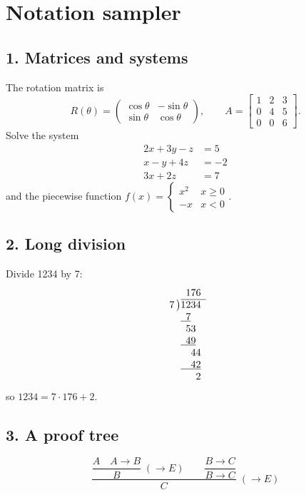 \documentclass[11pt]{article}
\begin{document}
\section*{Notation sampler}

\subsection*{1. Matrices and systems}
The rotation matrix is
\[ R(\theta) = \begin{pmatrix} \cos\theta & -\sin\theta \\ \sin\theta & \cos\theta \end{pmatrix}, \qquad
A = \begin{bmatrix} 1 & 2 & 3 \\ 0 & 4 & 5 \\ 0 & 0 & 6 \end{bmatrix}. \]
Solve the system
\begin{align*}
 2x + 3y - z &= 5 \\
 x - y + 4z &= -2 \\
 3x + 2z &= 7
\end{align*}
and the piecewise function $f(x) = \begin{cases} x^2 & x \ge 0 \\ -x & x < 0 \end{cases}$.

\subsection*{2. Long division}
Divide 1234 by 7:
\[
\begin{array}{r@{}l}
 & \phantom{0}176 \\ \cline{2-2}
 7 \,\big) & 1234 \\
 & \underline{\phantom{0}7}\phantom{00} \\
 & \phantom{0}53\phantom{0} \\
 & \underline{\phantom{0}49}\phantom{0} \\
 & \phantom{00}44 \\
 & \underline{\phantom{00}42} \\
 & \phantom{000}2
\end{array}
\]
so $1234 = 7 \cdot 176 + 2$.

\subsection*{3. A proof tree}
\[
\dfrac{\dfrac{A \quad A \to B}{B}\;(\to E) \qquad \dfrac{B \to C}{B \to C}}{C}\;(\to E)
\]
\end{document}
